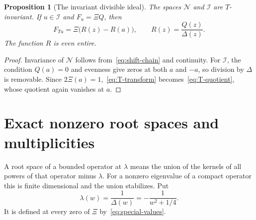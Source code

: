 \documentclass[11pt,a4paper]{article}
\numberwithin{equation}{section}
\newtheorem{proposition}[theorem]{Proposition}
\theoremstyle{definition}
\theoremstyle{remark}
\newcommand{\Nn}{\mathcal N}
\newcommand{\Ii}{\mathcal I}
\begin{document}
\begin{proposition}[The invariant divisible ideal]\label{prop:T-ideal}
The spaces $\Nn$ and $\Ii$ are $T$-invariant. If $u\in\Ii$ and $F_u=\Xi Q$, then
\begin{equation}\label{eq:T-quotient}
 F_{Tu}=\Xi\bigl(R(z)-R(a)\bigr),\qquad
 R(z)=\frac{Q(z)}{\Delta(z)}.
\end{equation}
The function $R$ is even entire.
\end{proposition}
\begin{proof}
Invariance of $\Nn$ follows from~\eqref{eq:shift-chain} and continuity. For $\Ii$, the condition $Q(a)=0$ and evenness give zeros at both $a$ and $-a$, so division by $\Delta$ is removable. Since $2\Xi(a)=1$,~\eqref{eq:T-transform} becomes~\eqref{eq:T-quotient}, whose quotient again vanishes at $a$.
\end{proof}

\section{Exact nonzero root spaces and multiplicities}\label{sec:roots}

A root space of a bounded operator at $\lambda$ means the union of the kernels of all powers of that operator minus $\lambda$. For a nonzero eigenvalue of a compact operator this is finite dimensional and the union stabilizes. Put
\begin{equation}\label{eq:lambda-w}
 \lambda(w)=\frac1{\Delta(w)}=-\frac1{w^2+1/4}.
\end{equation}
It is defined at every zero of $\Xi$ by~\eqref{eq:special-values}.
\end{document}
